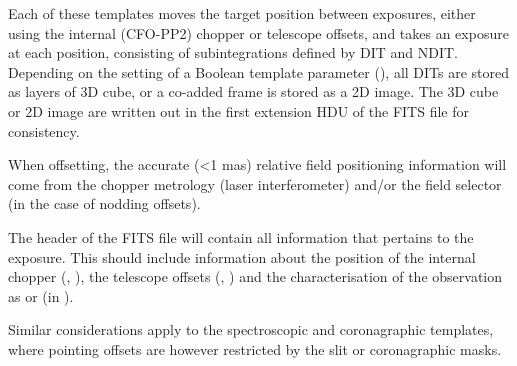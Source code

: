 Each of these templates moves the target position between exposures,
either using the internal (CFO-PP2) chopper or telescope offsets, and
takes an exposure at each position, consisting of subintegrations
defined by DIT and NDIT. Depending on the setting of a Boolean
template parameter (), all DITs are stored as
layers of 3D cube, or a co-added frame is stored as a 2D image.
The 3D cube or 2D image are written out in the first extension HDU of the FITS file for consistency.

When offsetting, the accurate (<1 mas) relative field positioning information will come from the chopper metrology (laser interferometer) and/or the field selector (in the case of nodding offsets).

The header of the FITS file will contain all information that pertains
to the exposure. This should include information about the position of
the internal chopper (,
), the telescope offsets (,
) and the characterisation of the observation as
 or  (in ).

Similar considerations apply to the spectroscopic and coronagraphic
templates, where pointing offsets are however restricted by the slit
or coronagraphic masks.



